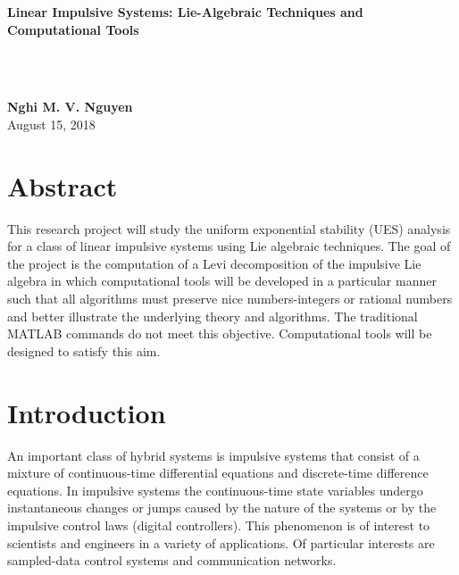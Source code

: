 \documentclass[11pt,a4paper]{article}
\begin{document}
\begin{center}
	\vspace*{1cm}
	
	\textbf{\Large Linear Impulsive Systems: Lie-Algebraic Techniques and Computational Tools}


	\vspace*{2cm}
	
	\\
	\\
	\vspace*{0.4cm}
	
	\vspace*{10cm}
	
	\textbf{Nghi M. V. Nguyen}\\
	August 15, 2018
	
	\vfill
	
	\vspace*{1cm}
\end{center}	

\pagebreak

\tableofcontents

\newpage

\listoffigures

\newpage

\section*{Abstract}
\qquad This research project will study the uniform exponential stability (UES) analysis for a class of linear impulsive systems using Lie algebraic techniques. The goal of the project is the computation of a Levi decomposition of the impulsive Lie algebra in which computational tools will be developed in a particular manner such that all algorithms must preserve nice numbers-integers or rational numbers and better illustrate the underlying theory and algorithms. The traditional MATLAB commands do not meet this objective. Computational tools will be designed to satisfy this aim. 

\section{Introduction}
\qquad An important class of hybrid systems is impulsive systems that consist of a mixture of continuous-time differential equations and discrete-time difference equations. In impulsive systems the continuous-time state variables undergo instantaneous changes or jumps caused by the nature of the systems or by the impulsive control laws (digital controllers). This phenomenon is of interest to scientists and engineers in a variety of applications. Of particular interests are sampled-data control systems and communication networks.
\end{document}
